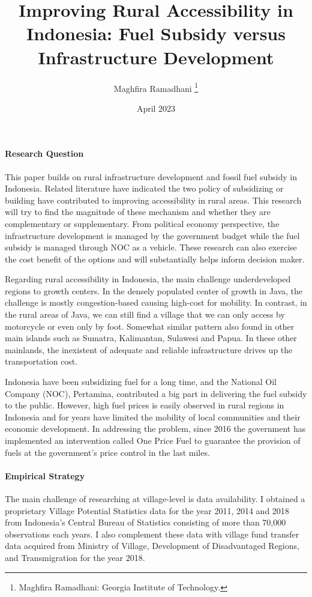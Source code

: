 \documentclass[letterpaper,11pt,leqno]{article}
\begin{document}
\title{Improving Rural Accessibility in Indonesia: Fuel Subsidy versus Infrastructure Development}
\author{Maghfira Ramadhani
\thanks{Maghfira Ramadhani: Georgia Institute of Technology.}}
\date{April 2023}       
\maketitle
 
\paragraph{Research Question} This paper builds on rural infrastructure development and fossil fuel subsidy in Indonesia. Related literature have indicated the two policy of subsidizing or building have contributed to improving accessibility in rural areas. This research will try to find the magnitude of these mechanism and whether they are complementary or supplementary. From political economy perspective, the infrastructure development is managed by the government budget while the fuel subsidy is managed through NOC as a vehicle. These research can also exercise the cost benefit of the options and will substantially helps inform decision maker.

Regarding rural accessibility in Indonesia, the main challenge underdeveloped regions to growth centers. In the densely populated center of growth in Java, the challenge is mostly congestion-based causing high-cost for mobility. In contrast, in the rural areas of Java, we can still find a village that we can only access by motorcycle or even only by foot. Somewhat similar pattern also found  in other main islands such as Sumatra, Kalimantan, Sulawesi and Papua. In these other mainlands, the inexistent of adequate and reliable infrastructure drives up the transportation cost.

Indonesia have been subsidizing fuel for a long time, and the National Oil Company (NOC), Pertamina, contributed a big part in delivering the fuel subsidy to the public. However, high fuel prices is easily observed in rural regions in Indonesia and for years have limited the mobility of local communities and their economic development. In addressing the problem, since 2016 the government has implemented an intervention called One Price Fuel to guarantee the provision of fuels at the government's price control in the last miles.


\paragraph{Empirical Strategy} The main challenge of researching at village-level is data availability. I obtained a proprietary Village Potential Statistics data for the year 2011, 2014 and 2018 from Indonesia's Central Bureau of Statistics consisting of more than 70,000 observations each years. I also complement these data with village fund transfer data acquired from Ministry of Village, Development of Disadvantaged Regions, and Transmigration for the year 2018.
\end{document}
